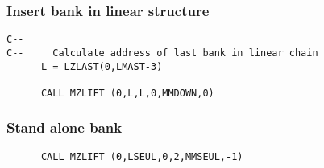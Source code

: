 \subsubsection{Insert bank in linear structure}
\par
\begin{verbatim}
C--
C--     Calculate address of last bank in linear chain
      L = LZLAST(0,LMAST-3)
 
      CALL MZLIFT (0,L,L,0,MMDOWN,0)
\end{verbatim}
\subsubsection{Stand alone bank}
\begin{verbatim}
      CALL MZLIFT (0,LSEUL,0,2,MMSEUL,-1)
\end{verbatim}
